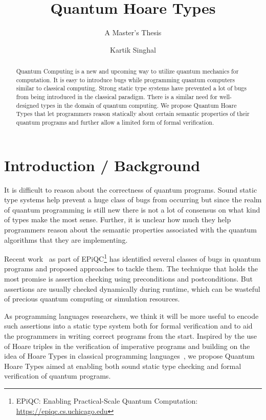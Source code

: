 \documentclass[acmsmall,nonacm,timestamp,review]{acmart}
\title{Quantum Hoare Types}
\subtitle{A Master's Thesis}
\author{Kartik Singhal}
\affiliation{
	\position{PhD Student}
	\department{Department of Computer Science}
	\institution{University of Chicago}
	\state{IL}
	\country{USA}}
\begin{document}
\begin{abstract}
Quantum Computing is a new and upcoming way to utilize quantum mechanics for computation. It is easy to introduce bugs while programming quantum computers similar to classical computing. Strong static type systems have prevented a lot of bugs from being introduced in the classical paradigm. There is a similar need for well-designed types in the domain of quantum computing. We propose Quantum Hoare Types that let programmers reason statically about certain semantic properties of their quantum programs and further allow a limited form of formal verification.
\end{abstract}

\maketitle

\renewcommand*\contentsname{Table of Contents}
\tableofcontents

\listoffigures

\newpage

\section{Introduction / Background}
It is difficult to reason about the correctness of quantum programs. Sound static type systems help prevent a huge class of bugs from occurring but since the realm of quantum programming is still new there is not a lot of consensus on what kind of types make the most sense. Further, it is unclear how much they help programmers reason about the semantic properties associated with the quantum algorithms that they are implementing.

Recent work~\cite{huang_qdb:_2018,huang_statistical_2019} as part of EPiQC\footnote{EPiQC: Enabling Practical-Scale Quantum Computation:  \url{https://epiqc.cs.uchicago.edu}} has identified several classes of bugs in quantum programs and proposed approaches to tackle them. The technique that holds the most promise is assertion checking using preconditions and postconditions. But assertions are usually checked dynamically during runtime, which can be wasteful of precious quantum computing or simulation resources.

As programming languages researchers, we think it will be more useful to encode such assertions into a static type system both for formal verification and to aid the programmers in writing correct programs from the start. Inspired by the use of Hoare triples in the verification of imperative programs and building on the idea of Hoare Types in classical programming languages~\cite{nanevski_hoare_2008}, we propose Quantum Hoare Types aimed at enabling both sound static type checking and formal verification of quantum programs.
\end{document}
